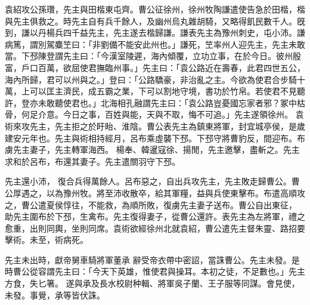 \begin{pinyinscope}
 
袁紹攻公孫瓚，先主與田楷東屯齊。曹公征徐州，徐州牧陶謙遣使告急於田楷，楷與先主俱救之。時先主自有兵千餘人，及幽州烏丸雜胡騎，又略得飢民數千人。旣到，謙以丹楊兵四千益先主，先主遂去楷歸謙。謙表先主為豫州刺史，屯小沛。謙病篤，謂別駕麋笁曰：「非劉備不能安此州也。」謙死，笁率州人迎先主，先主未敢當。下邳陳登謂先主曰：「今漢室陵遲，海內傾覆，立功立事，在於今日。彼州殷富，戶口百萬，欲屈使君撫臨州事。」先主曰：「袁公路近在壽春，此君四世五公，海內所歸，君可以州與之。」登曰：「公路驕豪，非治亂之主。今欲為使君合步騎十萬，上可以匡主濟民，成五霸之業，下可以割地守境，書功於竹帛。若使君不見聽許，登亦未敢聽使君也。」北海相孔融謂先主曰：「袁公路豈憂國忘家者邪？冢中枯骨，何足介意。今日之事，百姓與能，天與不取，悔不可追。」先主遂領徐州。
 袁術來攻先主，先主拒之於盱眙、淮陰。曹公表先主為鎮東將軍，封宜城亭侯，是歲建安元年也。先主與術相持經月，呂布乘虛襲下邳。下邳守將曹豹反，間迎布。布虜先主妻子，先主轉軍海西。
 楊奉、韓暹寇徐、揚閒，先主邀擊，盡斬之。先主求和於呂布，布還其妻子。先主遣關羽守下邳。
 
 
先主還小沛，
 復合兵得萬餘人。呂布惡之，自出兵攻先主，先主敗走歸曹公。曹公厚遇之，以為豫州牧。將至沛收散卒，給其軍糧，益與兵使東擊布。布遣高順攻之，曹公遣夏侯惇往，不能救，為順所敗，復虜先主妻子送布。曹公自出東征，
 助先主圍布於下邳，生禽布。先主復得妻子，從曹公還許。表先主為左將軍，禮之愈重，出則同輿，坐則同席。袁術欲經徐州北就袁紹，曹公遣先主督朱靈、路招要擊術。未至，術病死。
 
 
先主未出時，獻帝舅車騎將軍董承
 辭受帝衣帶中密詔，當誅曹公。先主未發。是時曹公從容謂先主曰：「今天下英雄，惟使君與操耳。本初之徒，不足數也。」先主方食，失匕箸。
 遂與承及長水校尉种輯、將軍吳子蘭、王子服等同謀。會見使，未發。事覺，承等皆伏誅。
 

\end{pinyinscope}
